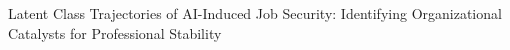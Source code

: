\documentclass[]{article}
\begin{document}
Latent Class Trajectories of AI-Induced Job Security: Identifying Organizational Catalysts for Professional Stability
\end{document}
